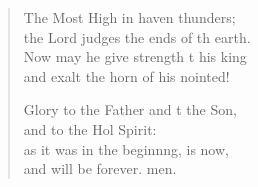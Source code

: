 \begin{verse}
\begin{patverse}
The Most High in haven thunders;\Med\\
the Lord judges the ends of th earth.\\
Now may he give strength t his king\Med\\
and exalt the horn of his nointed!

Glory to the Father and t the Son,\Med\\
and to the Hol Spirit:\\
as it was in the beginn\pointup{\i}ng, is now,\Med\\
and will be forever. men.
  \end{patverse}
\end{verse}
